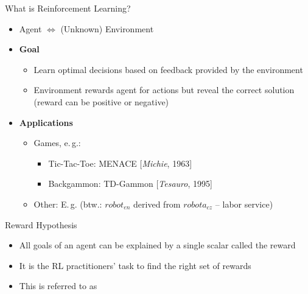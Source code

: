 \begin{frame}{What is Reinforcement Learning?}{}
	\begin{itemize}
		\item Agent $\Leftrightarrow$ (Unknown) Environment
		\item \textbf{Goal}
		\begin{itemize}
			\item Learn optimal decisions based on feedback provided by the environment
			\item Environment rewards agent for actions but  reveal the correct solution
				(reward can be positive or negative)
		\end{itemize}
		\item \textbf{Applications}
		\begin{itemize}
			\item Games, e.\,g.:
			\begin{itemize}
				\item Tic-Tac-Toe: MENACE [\textit{Michie}, 1963]
				\item Backgammon: TD-Gammon [\textit{Tesauro}, 1995]
			\end{itemize}
			\item Other: E.\,g. 
				\href{https://www.youtube.com/watch?v=W_gxLKSsSIE}{}
				\scriptsize (btw.: $robot_{en}$ derived from $robota_{cz}$ -- labor service)
		\end{itemize}
	\end{itemize}
\end{frame}


\begin{frame}{Reward Hypothesis}{}
	\begin{itemize}
		\item All goals of an agent can be explained by a single scalar called the reward
		\item It is the RL practitioners' task to find the right set of rewards
		\item This is referred to as 
	\end{itemize}

	\vspace*{3mm}
	\begin{boxBlueNoFrame}
		 \\[2mm]
		\footnotesize
	\end{boxBlueNoFrame}
\end{frame}


